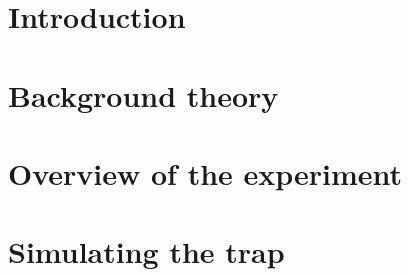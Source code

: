 \documentclass[a4paper, 12pt, twoside]{report}
\begin{document}


%
%
%
%
%
%
%

\tableofcontents
\clearpage

\setcounter{page}{5} 




\chapter{Introduction}
\label{intro}
%

\chapter{Background theory}
\label{theory}


\chapter{Overview of the experiment}
\label{overview}


\chapter{Simulating the trap}
\label{sim}

\end{document}
